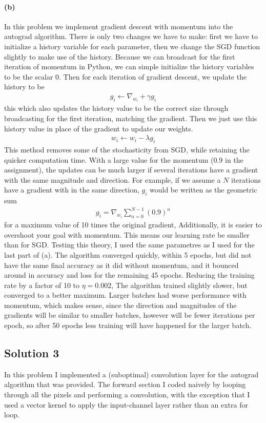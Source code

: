 \documentclass{article}
\newcommand{\solution}[1]{\clearpage \subsection*{Solution #1}}
\newcommand{\spart}[1]{\paragraph{(#1)}}
\begin{document}
\spart{b} In this problem we implement gradient descent with momentum into the autograd algorithm. There is only two changes we have to make: first we have to initialize a history variable for each parameter, then we change the SGD function slightly to make use of the history. Because we can broadcast for the first iteration of momentum in Python, we can simple initialize the history variables to be the scalar 0. Then for each iteration of gradient descent, we update the history to be 
\begin{align}
	g_i \leftarrow \nabla_{w_i} + \gamma g_i
\end{align}
this which also updates the history value to be the correct size through broadcasting for the first iteration, matching the gradient. Then we just use this history value in place of the gradient to update our weights.
\begin{align}
	w_i \leftarrow w_i -\lambda g_i
\end{align}
This method removes some of the stochasticity from SGD, while retaining the quicker computation time. With a large value for the momentum (0.9 in the assignment), the updates can be much larger if several iterations have a gradient with the same magnitude and direction. For example, if we assume a $N$ iterations have a gradient with in the same direction, $g_i$ would be written as the geometric sum
\begin{align}
	g_i = \nabla_{w_i} \sum_{n=0}^{N-1} (0.9)^n
\end{align}
for a maximum value of 10 times the original gradient, Additionally, it is easier to overshoot your goal with momentum. This means our learning rate be smaller than for SGD. Testing this theory, I used the same parametres as I used for the last part of (a). The algorithm converged quickly, within 5 epochs, but did not have the same final accuracy as it did without momentum, and it bounced around in accuracy and loss for the remaining 45 epochs. Reducing the training rate by a factor of 10 to $\eta = 0.002$, The algorithm trained slightly slower, but converged to a better maximum. Larger batches had worse performance with momentum, which makes sense, since the direction and magnitudes of the gradients will be similar to smaller batches, however will be fewer iterations per epoch, so after 50 epochs less training will have happened for the larger batch. 

\solution{3} 
In this problem I implemented a (suboptimal) convolution layer for the autograd algorithm that was provided. The forward section I coded naively by looping through all the pixels and performing a convolution, with the exception that I used a vector kernel to apply the input-channel layer rather than an extra for loop. 
\end{document}
